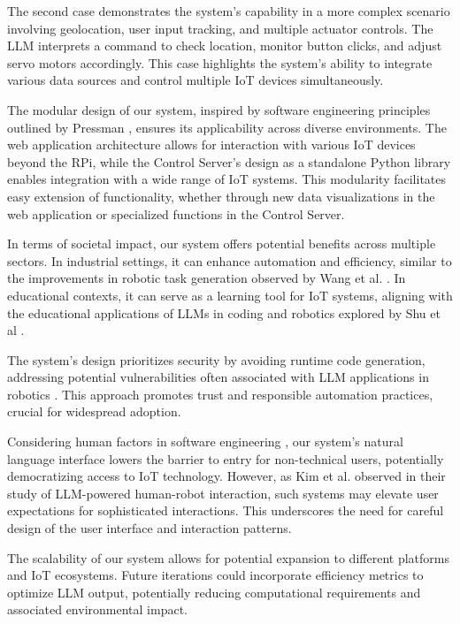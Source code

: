 \documentclass{ieeeaccess}
\begin{document}
The second case demonstrates the system's capability in a more complex scenario involving geolocation, user input tracking, and multiple actuator controls. The LLM interprets a command to check location, monitor button clicks, and adjust servo motors accordingly. This case highlights the system's ability to integrate various data sources and control multiple IoT devices simultaneously.

The modular design of our system, inspired by software engineering principles outlined by Pressman \cite{pressman2020software}, ensures its applicability across diverse environments. The web application architecture allows for interaction with various IoT devices beyond the RPi, while the Control Server's design as a standalone Python library enables integration with a wide range of IoT systems. This modularity facilitates easy extension of functionality, whether through new data visualizations in the web application or specialized functions in the Control Server.

In terms of societal impact, our system offers potential benefits across multiple sectors. In industrial settings, it can enhance automation and efficiency, similar to the improvements in robotic task generation observed by Wang et al. \cite{wang2024gensimgeneratingroboticsimulation}. In educational contexts, it can serve as a learning tool for IoT systems, aligning with the educational applications of LLMs in coding and robotics explored by Shu et al \cite{shu2024llmscodingroboticseducation}.

The system's design prioritizes security by avoiding runtime code generation, addressing potential vulnerabilities often associated with LLM applications in robotics \cite{wang2024gensimgeneratingroboticsimulation}. This approach promotes trust and responsible automation practices, crucial for widespread adoption.

Considering human factors in software engineering \cite{1553657}, our system's natural language interface lowers the barrier to entry for non-technical users, potentially democratizing access to IoT technology. However, as Kim et al. \cite{10.1145/3610977.3634966} observed in their study of LLM-powered human-robot interaction, such systems may elevate user expectations for sophisticated interactions. This underscores the need for careful design of the user interface and interaction patterns.

The scalability of our system allows for potential expansion to different platforms and IoT ecosystems. Future iterations could incorporate efficiency metrics to optimize LLM output, potentially reducing computational requirements and associated environmental impact.
\end{document}
